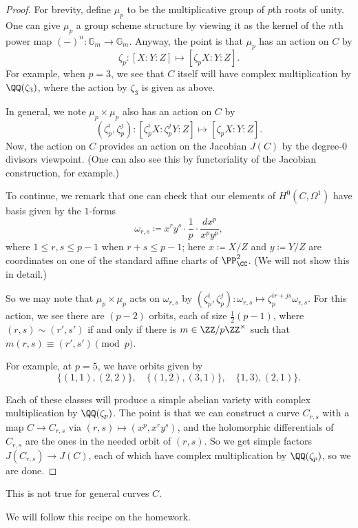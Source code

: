 \documentclass[../notes.tex]{subfiles}
\begin{document}
\begin{proof}
	For brevity, define $\mu_p$ to be the multiplicative group of $p$th roots of unity. One can give $\mu_p$ a group scheme structure by viewing it as the kernel of the $n$th power map $(-)^n\colon\mathbb G_m\to\mathbb G_m$. Anyway, the point is that $\mu_p$ has an action on $C$ by
	\[\zeta_p\colon[X:Y:Z]\mapsto[\zeta_pX:Y:Z].\]
	For example, when $p=3$, we see that $C$ itself will have complex multiplication by $\QQ(\zeta_3)$, where the action by $\zeta_3$ is given as above.

	In general, we note $\mu_p\times\mu_p$ also has an action on $C$ by
	\[(\zeta_p^i,\zeta_p^j)\colon[\zeta_p^iX:\zeta_p^jY:Z]\mapsto[\zeta_pX:Y:Z].\]
	Now, the action on $C$ provides an action on the Jacobian $J(C)$ by the degree-$0$ divisors viewpoint. (One can also see this by functoriality of the Jacobian construction, for example.)
	
	To continue, we remark that one can check that our elements of $H^0(C,\Omega^1)$ have basis given by the $1$-forms
	\[\omega_{r,s}\coloneqq x^ry^s\cdot\frac1p\cdot\frac{dx^p}{x^py^p},\]
	where $1\le r,s\le p-1$ when $r+s\le p-1$; here $x\coloneqq X/Z$ and $y\coloneqq Y/Z$ are coordinates on one of the standard affine charts of $\PP^2_\CC$. (We will not show this in detail.)
	
	So we may note that $\mu_p\times\mu_p$ acts on $\omega_{r,s}$ by $(\zeta_p^i,\zeta_p^j)\colon\omega_{r,s}\mapsto\zeta_p^{ir+js}\omega_{r,s}$. For this action, we see there are $(p-2)$ orbits, each of size $\frac12(p-1)$, where $(r,s)\sim(r',s')$ if and only if there is $m\in\ZZ/p\ZZ^\times$ such that $m(r,s)\equiv(r',s')\pmod p$.
	\begin{example}
		For example, at $p=5$, we have orbits given by
		\[\{(1,1),(2,2)\},\quad\{(1,2),(3,1)\},\quad\{1,3),(2,1)\}.\]
	\end{example}
	Each of these classes will produce a simple abelian variety with complex multiplication by $\QQ(\zeta_p)$. The point is that we can construct a curve $C_{r,s}$ with a map $C\to C_{r,s}$ via $(r,s)\mapsto\left(x^p,x^ry^s\right)$, and the holomorphic differentials of $C_{r,s}$ are the ones in the needed orbit of $(r,s)$. So we get simple factors $J(C_{r,s})\to J(C)$, each of which have complex multiplication by $\QQ(\zeta_p)$, so we are done.
\end{proof}
\begin{remark}
	This is not true for general curves $C$.
\end{remark}
\begin{remark}
	We will follow this recipe on the homework.
\end{remark}
\end{document}
